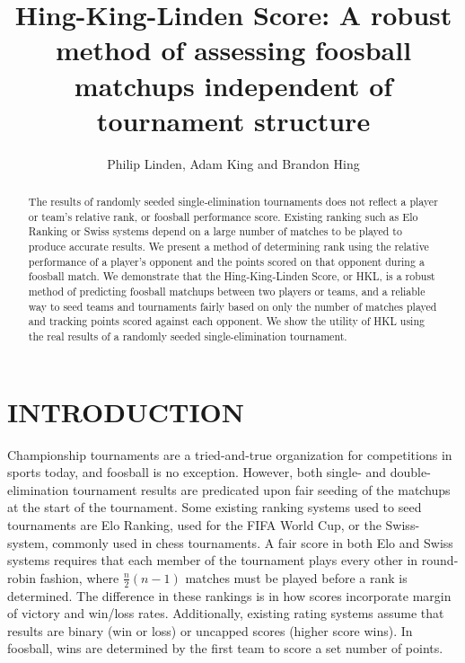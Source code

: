 \documentclass[letterpaper, 10 pt, conference]{ieeeconf}  %
\title{\LARGE \bf
Hing-King-Linden Score: 
A robust method of assessing foosball matchups independent of tournament structure
}
\author{Philip Linden, Adam King and Brandon Hing%
}
\begin{document}
\maketitle
\thispagestyle{empty}
\pagestyle{empty}


\begin{abstract}

The results of randomly seeded single-elimination tournaments does not reflect a player or team's relative rank, or foosball performance score. 
Existing ranking such as Elo Ranking or Swiss systems depend on a large number of matches to be played to produce accurate results. 
We present a method of determining rank using the relative performance of a player's opponent and the points scored on that opponent during a foosball match.
We demonstrate that the Hing-King-Linden Score, or HKL, is a robust method of predicting foosball matchups between two players or teams, and a reliable way to seed teams and tournaments fairly based on only the number of matches played and tracking points scored against each opponent.
We show the utility of HKL using the real results of a randomly seeded single-elimination tournament.

\end{abstract}


\section{INTRODUCTION}

Championship tournaments are a tried-and-true organization for competitions in sports today, and foosball is no exception. 
However, both single- and double-elimination tournament results are predicated upon fair seeding of the matchups at the start of the tournament.
Some existing ranking systems used to seed tournaments are Elo Ranking\cite{}, used for the FIFA World Cup\cite{}, or the Swiss-system\cite{}, commonly used in chess tournaments\cite{}.
A fair score in both Elo and Swiss systems requires that each member of the tournament plays every other in round-robin fashion, where $\frac{n}{2}(n-1)$ matches must be played before a rank is determined. 
The difference in these rankings is in how scores incorporate margin of victory and win/loss rates.
Additionally, existing rating systems assume that results are binary (win or loss) or uncapped scores (higher score wins). In foosball, wins are determined by the first team to score a set number of points. 
\end{document}
